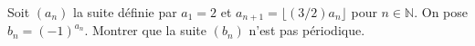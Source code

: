 Soit $(a_n)$ la suite définie par $a_1 = 2$ et $a_{n+1} = \lfloor (3/2)a_n \rfloor$ pour $n \in \mathbb{N}$. On pose $b_n = (-1)^{a_n}$. Montrer que la suite $(b_n)$ n'est pas périodique.
